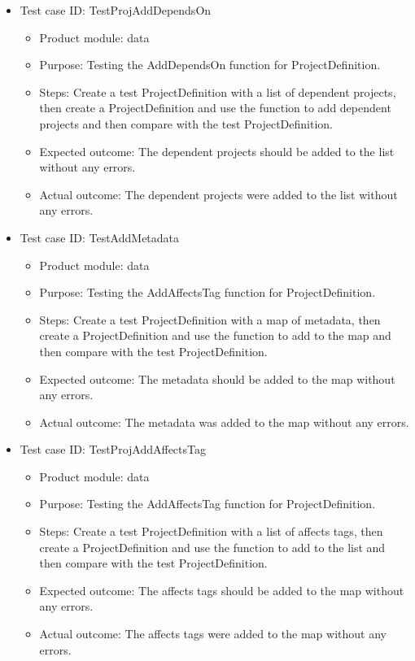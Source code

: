 \documentclass[11pt]{article}
\begin{document}
\begin{itemize}
    \item Test case ID: TestProjAddDependsOn
    \begin{itemize}
        \item Product module: data
        \item Purpose: Testing the AddDependsOn function for ProjectDefinition.
        \item Steps: Create a test ProjectDefinition with a list of dependent projects, then create a ProjectDefinition and use the function to add dependent projects and then compare with the test ProjectDefinition.
        \item Expected outcome: The dependent projects should be added to the list without any errors.
        \item Actual outcome: The dependent projects were added to the list without any errors.
    \end{itemize}
\end{itemize}

\begin{itemize}
    \item Test case ID: TestAddMetadata
    \begin{itemize}
        \item Product module: data
        \item Purpose: Testing the AddAffectsTag function for ProjectDefinition.
        \item Steps: Create a test ProjectDefinition with a map of metadata, then create a ProjectDefinition and use the function to add to the map and then compare with the test ProjectDefinition.
        \item Expected outcome: The metadata should be added to the map without any errors.
        \item Actual outcome: The metadata was added to the map without any errors.
    \end{itemize}
\end{itemize}

\begin{itemize}
    \item Test case ID: TestProjAddAffectsTag
    \begin{itemize}
        \item Product module: data
        \item Purpose: Testing the AddAffectsTag function for ProjectDefinition.
        \item Steps: Create a test ProjectDefinition with a list of affects tags, then create a ProjectDefinition and use the function to add to the list and then compare with the test ProjectDefinition.
        \item Expected outcome: The affects tags should be added to the map without any errors.
        \item Actual outcome: The affects tags were added to the map without any errors.
    \end{itemize}
\end{itemize}
\end{document}
